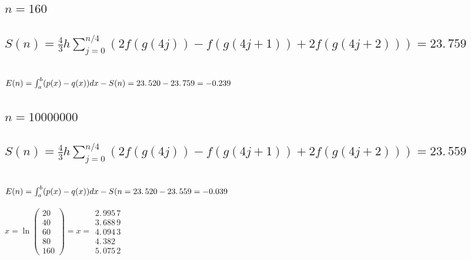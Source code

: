 \documentclass{article}
\begin{document}
\bigskip

\subsection{$n=160$}

\subsection{$S(n)=\frac{4}{3}h\sum%
\limits_{j=0}^{n/4}(2f(g(4j))-f(g(4j+1))+2f(g(4j+2)))=23.\,\allowbreak 759$}

\subsection{$E(n)=\protect\int_{a}^{b}(p(x)-q(x))dx\allowbreak
-S(n)=23.\,\allowbreak 520-23.\,\allowbreak 759=-\allowbreak 0.239$}

\bigskip

\subsection{$n=10000000$}

\subsection{$S(n)=\frac{4}{3}h\sum%
\limits_{j=0}^{n/4}(2f(g(4j))-f(g(4j+1))+2f(g(4j+2)))=\allowbreak
23.\,\allowbreak 559$}

\subsection{$E(n)=\protect\int_{a}^{b}(p(x)-q(x))dx-S(n\allowbreak
=23.\,\allowbreak 520-\allowbreak 23.\,\allowbreak 559=-\allowbreak 0.039\,$}

\bigskip

\bigskip

\bigskip

\bigskip $x=\ln (%
\begin{array}{c}
20 \\ 
40 \\ 
60 \\ 
80 \\ 
160%
\end{array}%
)=\allowbreak x=%
\begin{array}{c}
2.\,\allowbreak 995\,7 \\ 
3.\,\allowbreak 688\,9 \\ 
4.\,\allowbreak 094\,3 \\ 
4.\,\allowbreak 382 \\ 
5.\,\allowbreak 075\,2%
\end{array}%
\allowbreak $
\end{document}
